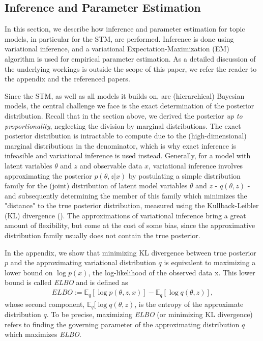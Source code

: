 \subsection{Inference and Parameter Estimation}
\label{Inference and Parameter Estimation}

In this section, we describe how inference and parameter estimation for topic models, in particular for the STM, are performed. Inference is done using variational inference, and a variational Expectation-Maximization (EM) algorithm is used for empirical parameter estimation. As a detailed discussion of the underlying workings is outside the scope of this paper, we refer the reader to the appendix and the referenced papers.

Since the STM, as well as all models it builds on, are (hierarchical) Bayesian models, the central challenge we face is the exact determination of the posterior distribution. Recall that in the section above, we derived the posterior \textit{up to proportionality}, neglecting the division by marginal distributions. The exact posterior distribution is intractable to compute due to the (high-dimensional) marginal distributions in the denominator, which is why exact inference is infeasible and variational inference is used instead. Generally, for a model with latent variables $\theta$ and $z$ and observable data $x$, variational inference involves approximating the posterior $p(\theta,z|x)$ by postulating a simple distribution family for the (joint) distribution of latent model variables $\theta$ and $z$ - $q(\theta,z)$ - and subsequently determining the member of this family which minimizes the "distance" to the true posterior distribution, measured using the Kullback-Leibler (KL) divergence (\citealp{wang2013variational}). The approximations of variational inference bring a great amount of flexibility, but come at the cost of some bias, since the approximative distribution family usually does not contain the true posterior.

In the appendix, we show that minimizing KL divergence between true posterior $p$ and the approximating variational distribution $q$ is equivalent to maximizing a lower bound on $\log p(x)$, the log-likelihood of the observed data x. This lower bound is called \textit{ELBO} and is defined as
\begin{align*}
ELBO := \mathbb{E}_q[\log p(\theta,z,x)] - \mathbb{E}_q[\log q(\theta,z)],
\end{align*}
whose second component, $\mathbb{E}_q[\log q(\theta,z)$, is the entropy of the approximate distribution $q$. To be precise, maximizing \textit{ELBO} (or minimizing KL divergence) refers to finding the governing parameter of the approximating distribution $q$ which maximizes \textit{ELBO}.

